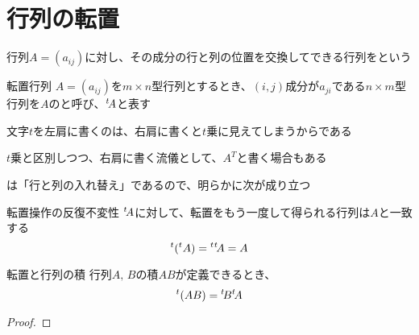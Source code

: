 \documentclass[../../../topic_linear-algebra]{subfiles}
\begin{document}
\sectionline
\section{行列の転置}

行列$A=(a_{ij})$に対し、その成分の行と列の位置を交換してできる行列をという

\begin{definition}{転置行列}
  $A = (a_{ij})$を$m \times n$型行列とするとき、$(i,j)$成分が$a_{ji}$である$n \times m$型行列を$A$のと呼び、${}^t\! A$と表す
\end{definition}

文字$t$を左肩に書くのは、右肩に書くと$t$乗に見えてしまうからである

$t$乗と区別しつつ、右肩に書く流儀として、$A^T$と書く場合もある

\sectionline

は「行と列の入れ替え」であるので、明らかに次が成り立つ

\begin{theorem}{転置操作の反復不変性}
  ${}^t\! A$に対して、転置をもう一度して得られる行列は$A$と一致する
  \begin{equation*}
    {}^t ({}^t A) = {}^t{}^t\! A = A
  \end{equation*}
\end{theorem}

\sectionline

\begin{theorem}{転置と行列の積}
  行列$A,\,B$の積$AB$が定義できるとき、
  \begin{equation*}
    {}^t (AB) = {}^t\! B {}^t\! A
  \end{equation*}
\end{theorem}

\begin{proof}
\end{proof}
\end{document}
